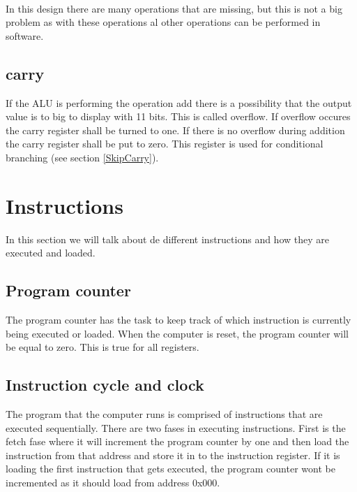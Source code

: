 \documentclass{article}
\begin{document}
~\\
In this design there are many operations that are missing, but this is not a big problem as with these operations al other operations can be performed in software.
\subsection{carry\label{ALU}}
If the ALU is performing the operation add there is a possibility that the output value is to big to display with 11 bits. This is called overflow. If overflow occures the carry register shall be turned to one. If there is no overflow during addition the carry register shall be put to zero. This register is used for conditional branching (see section  \ref{SkipCarry}).
\section{Instructions}
In this section we will talk about de different instructions and how they are executed and loaded.
\subsection{Program counter}
The program counter has the task to keep track of which instruction is currently being executed or loaded. When the computer is reset, the program counter will be equal to zero. This is true for all registers.
\subsection{Instruction cycle and clock\label{Instruction cycle}}
The program that the computer runs is comprised of instructions that are executed sequentially. There are two fases in executing instructions. First is the fetch fase where it will increment the program counter by one and then load the instruction from that address and store it in to the instruction register. If it is loading the first instruction that gets executed, the program counter wont be incremented as it should load from address 0x000. 
\end{document}
